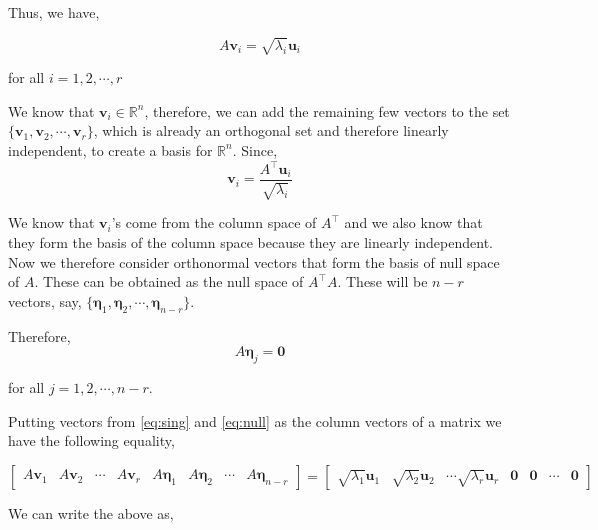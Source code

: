 \documentclass[a4paper]{article}
\begin{document}
Thus, we have,

\begin{equation}
A\boldsymbol{v}_i = \sqrt{\lambda_{i}}\boldsymbol{u}_i
\label{eq:sing}
\end{equation}

for all $i=1,2,\cdots,r$

We know that $\boldsymbol{v}_i \in \mathbb{R}^{n}$, therefore, we can add the remaining few vectors to the set $\{ \boldsymbol{v}_1, \boldsymbol{v}_2, \cdots, \boldsymbol{v}_r \}$, which is already an orthogonal set and therefore linearly independent, to create a basis for $\mathbb{R}^n$. Since, \begin{equation*}
\boldsymbol{v}_i = \frac{A^{\top}\boldsymbol{u}_i}{\sqrt{\lambda_i}}
\end{equation*}

We know that $\boldsymbol{v}_i$'s come from the column space of $A^{\top}$ and we also know that they form the basis of the column space because they are linearly independent. Now we therefore consider orthonormal vectors that form the basis of null space of $A$. These can be obtained as the null space of $A^{\top}A$. These will be $n-r$ vectors, say, $\{ \boldsymbol{\eta}_1, \boldsymbol{\eta}_2, \cdots, \boldsymbol{\eta}_{n-r} \}$.

Therefore, \begin{equation}
A \boldsymbol{\eta}_j = \boldsymbol{0}
\label{eq:null}
\end{equation}

for all $j=1,2,\cdots,n-r$.

Putting vectors from \ref{eq:sing} and \ref{eq:null} as the column vectors of a matrix we have the following equality,

\begin{equation}
\begin{bmatrix}
A \boldsymbol{v}_1 & A \boldsymbol{v}_2 & \cdots & A \boldsymbol{v}_r & A \boldsymbol{\eta}_1 & A \boldsymbol{\eta}_2 & \cdots &A \boldsymbol{\eta}_{n-r}
\end{bmatrix} = \begin{bmatrix}
\sqrt{\lambda_{1}}\boldsymbol{u}_1 & \sqrt{\lambda_{2}}\boldsymbol{u}_2 &
\cdots \sqrt{\lambda_{r}}\boldsymbol{u}_r & \boldsymbol{0} & \boldsymbol{0} & \cdots & \boldsymbol{0}
\end{bmatrix}
\end{equation}

We can write the above as,
\end{document}

